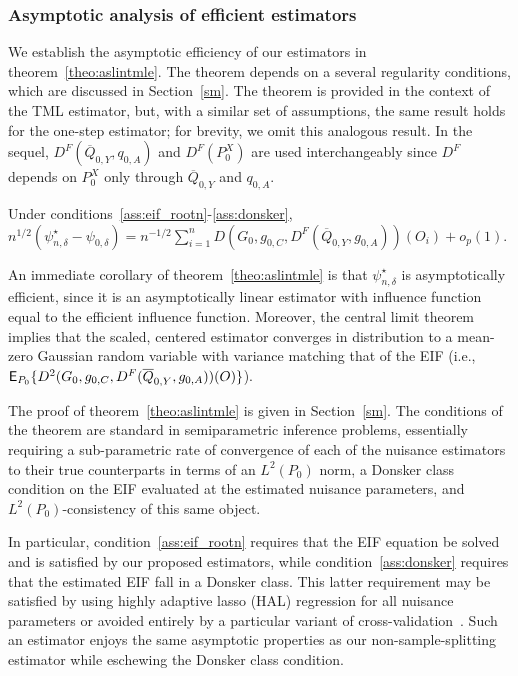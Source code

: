 \subsubsection{Asymptotic analysis of efficient estimators}\label{asymp_analy}

We establish the asymptotic efficiency of our estimators in
theorem~\ref{theo:aslintmle}. The theorem depends on a several regularity
conditions, which are discussed in Section~\ref{sm}. The
theorem is provided in the context of the TML estimator, but, with a similar set
of assumptions, the same result holds for the one-step estimator; for brevity,
we omit this analogous result. In the sequel, $D^F(\overline{Q}_{0,Y}, q_{0,A})$
and $D^F(P_0^X)$ are used interchangeably since $D^F$ depends on $P_0^X$ only
through $\overline{Q}_{0,Y}$ and $q_{0,A}$.

\begin{theorem}\label{theo:aslintmle} Under
  conditions~\ref{ass:eif_rootn}-\ref{ass:donsker},
  $n^{1/2}\left(\psi_{n,\delta}^{\star} - \psi_{0,\delta}\right) =
      n^{-1/2} \sum^{n}_{i = 1} D(G_0, g_{0,C},
      D^F(\overline{Q}_{0,Y},g_{0,A}))(O_i) + o_p(1) $.
\end{theorem}

An immediate corollary of theorem~\ref{theo:aslintmle} is that
$\psi_{n,\delta}^{\star}$ is asymptotically efficient, since it is an
asymptotically linear estimator with influence function equal to the efficient
influence function. Moreover, the central limit theorem implies that the scaled,
centered estimator converges in distribution to a mean-zero Gaussian random
variable with variance matching that of the EIF (i.e., $\mathsf{E}_{P_0} \{D^2(G_0,
g_{0,C}, D^F(\overline{Q}_{0,Y},g_{0,A}))(O)\}$).

The proof of theorem~\ref{theo:aslintmle} is given in
Section~\ref{sm}. The conditions of the theorem are standard
in semiparametric inference problems, essentially requiring a sub-parametric
rate of convergence of each of the nuisance estimators to their true
counterparts in terms of an $L^2(P_0)$ norm, a Donsker class condition on the
EIF evaluated at the estimated nuisance parameters, and $L^2(P_0)$-consistency
of this same object.

In particular, condition~\ref{ass:eif_rootn} requires that the EIF equation
be solved and is satisfied by our proposed estimators, while
condition~\ref{ass:donsker} requires that the estimated EIF fall in
a Donsker class. This latter requirement may be satisfied by using highly
adaptive lasso (HAL) regression for all nuisance parameters or avoided entirely
by a particular variant of cross-validation~\citep{klaassen1987consistent,
zheng2011cross, chernozhukov2018double}. Such an estimator enjoys the same
asymptotic properties as our non-sample-splitting estimator while eschewing the
Donsker class condition.

